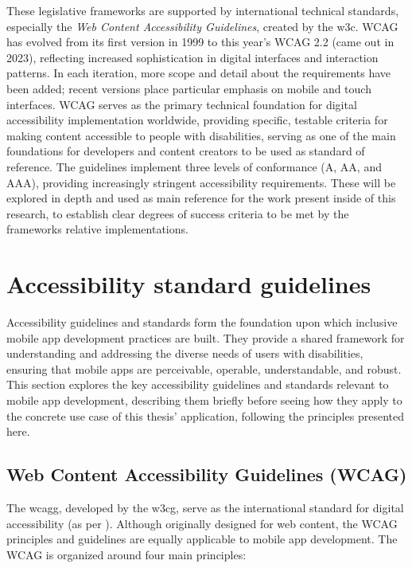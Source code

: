 These legislative frameworks are supported by international technical standards, especially the \textit{Web Content Accessibility Guidelines}, created by the \acrshort{w3c}. WCAG has evolved from its first version in 1999 to this year's WCAG 2.2 (came out in 2023), reflecting increased sophistication in digital interfaces and interaction patterns. In each iteration, more scope and detail about the requirements have been added; recent versions place particular emphasis on mobile and touch interfaces. WCAG serves as the primary technical foundation for digital accessibility implementation worldwide, providing specific, testable criteria for making content accessible to people with disabilities, serving as one of the main foundations for developers and content creators to be used as standard of reference. The guidelines implement three levels of conformance (A, AA, and AAA), providing increasingly stringent accessibility requirements. These will be explored in depth and used as main reference for the work present inside of this research, to establish clear degrees of success criteria to be met by the frameworks relative implementations.

\section{Accessibility standard guidelines}
\label{sec:accessibility-guidelines}

Accessibility guidelines and standards form the foundation upon which inclusive mobile app development practices are built. They provide a shared framework for understanding and addressing the diverse needs of users with disabilities, ensuring that mobile apps are perceivable, operable, understandable, and robust. This section explores the key accessibility guidelines and standards relevant to mobile app development, describing them briefly before seeing how they apply to the concrete use case of this thesis' application, following the principles presented here.

\subsection{Web Content Accessibility Guidelines (WCAG)}

The \gls{wcagg}, developed by the \gls{w3cg}, serve as the international standard for digital accessibility (as per \cite{site:wcag}). Although originally designed for web content, the WCAG principles and guidelines are equally applicable to mobile app development. The WCAG is organized around four main principles:

